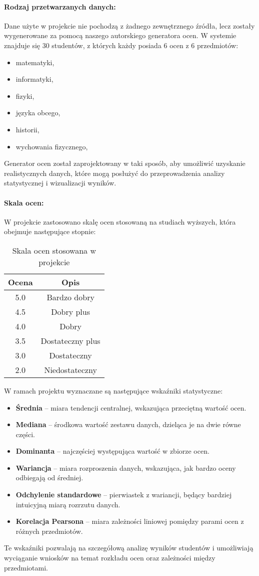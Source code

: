 \paragraph{Rodzaj przetwarzanych danych:} Dane użyte w projekcie nie pochodzą z żadnego zewnętrznego źródła, lecz zostały wygenerowane za pomocą naszego autorskiego generatora ocen. W systemie znajduje się 30 studentów, z których każdy posiada 6 ocen z 6 przedmiotów: 
\begin{itemize}
	\item matematyki,
	\item informatyki,
	\item fizyki,
	\item języka obcego,
	\item historii,
	\item wychowania fizycznego,
\end{itemize}
\vspace{20pt}
 Generator ocen został zaprojektowany w taki sposób, aby umożliwić uzyskanie realistycznych danych, które mogą posłużyć do przeprowadzenia analizy statystycznej i wizualizacji wyników.
 
 
\newpage
\paragraph{Skala ocen:} W projekcie zastosowano skalę ocen stosowaną na studiach wyższych, która obejmuje następujące stopnie:

\begin{table}[ht]
	\centering
	\begin{tabular}{|c|c|}
		\hline
		\textbf{Ocena} & \textbf{Opis} \\
		\hline
		5.0 & Bardzo dobry \\
		4.5 & Dobry plus \\
		4.0 & Dobry \\
		3.5 & Dostateczny plus \\
		3.0 & Dostateczny \\
		2.0 & Niedostateczny \\
		\hline
	\end{tabular}
	\caption{Skala ocen stosowana w projekcie}
\end{table}

W ramach projektu wyznaczane są następujące wskaźniki statystyczne:
\begin{itemize}
	\item \textbf{Średnia} – miara tendencji centralnej, wskazująca przeciętną wartość ocen.
	\item \textbf{Mediana} – środkowa wartość zestawu danych, dzieląca je na dwie równe części.
	\item \textbf{Dominanta} – najczęściej występująca wartość w zbiorze ocen.
	\item \textbf{Wariancja} – miara rozproszenia danych, wskazująca, jak bardzo oceny odbiegają od średniej.
	\item \textbf{Odchylenie standardowe} – pierwiastek z wariancji, będący bardziej intuicyjną miarą rozrzutu danych.
	\item \textbf{Korelacja Pearsona} – miara zależności liniowej pomiędzy parami ocen z różnych przedmiotów.
\end{itemize}


Te wskaźniki pozwalają na szczegółową analizę wyników studentów i umożliwiają wyciąganie wniosków na temat rozkładu ocen oraz zależności między przedmiotami.